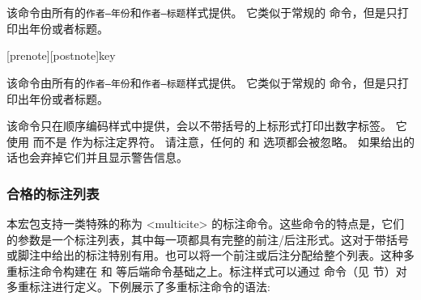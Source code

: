 \begin{ltxsyntax}
该命令由所有的\texttt{作者--年份}和\texttt{作者--标题}样式提供。
它类似于常规的  命令，但是只打印出年份或者标题。

[prenote][postnote]{key}

该命令由所有的\texttt{作者--年份}和\texttt{作者--标题}样式提供。
它类似于常规的  命令，但是只打印出年份或者标题。


该命令只在顺序编码样式中提供，会以不带括号的上标形式打印出数字标签。
它使用   而不是  作为标注定界符。
请注意，任何的   和  选项都会被忽略。
如果给出的话也会弃掉它们并且显示警告信息。

\end{ltxsyntax}

\subsubsection{合格的标注列表}%
\label{use:cit:mlt}

本宏包支持一类特殊的称为 <multicite> 的标注命令。这些命令的特点是，它们的参数是一个标注列表，其中每一项都具有完整的前注/后注形式。这对于带括号或脚注中给出的标注特别有用。也可以将一个前注或后注分配给整个列表。这种多重标注命令构建在  和  等后端命令基础之上。标注样式可以通过 命令（见  节）对多重标注进行定义。下例展示了多重标注命令的语法:

